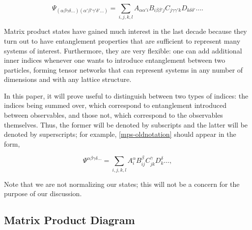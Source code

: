 \documentclass[12pt]{amsbook}
\theoremstyle{plain}
\theoremstyle{definition}
\theoremstyle{remark}
\begin{document}
$$\Psi_{(\alpha\beta\gamma\delta\dots)(\alpha'\beta'\gamma'\delta'\dots)} = \sum_{i,j,k,l} A_{\alpha\alpha' i} B_{i\beta\beta'j} C_{j\gamma\gamma'k} D_{k \delta\delta'} \dots.$$

Matrix product states have gained much interest in the last decade because they turn out to have entanglement properties that are sufficient to represent many systems of interest.  Furthermore, they are very flexible:  one can add additional inner indices whenever one wants to introduce entanglement between two particles, forming tensor networks that can represent systems in any number of dimensions and with any lattice structure.

In this paper, it will prove useful to distinguish between two types of indices:  the indices being summed over, which correspond to entanglement introduced between observables, and those not, which correspond to the observables themselves.  Thus, the former will be denoted by subscripts and the latter will be denoted by superscripts; for example, \eqref{mps-oldnotation} should appear in the form,

$$\Psi^{\alpha\beta\gamma\delta\dots} = \sum_{i,j,k,l} A_i^\alpha B_{ij}^\beta C_{jk}^\gamma D_{k}^\delta \dots,$$

Note that we are not normalizing our states;  this will not be a concern for the purpose of our discussion.
\subsection{Matrix Product Diagram}
\end{document}
